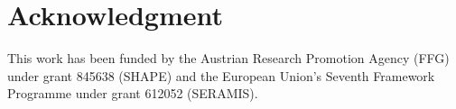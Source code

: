 \documentclass[conference]{IEEEtran}
\begin{document}






\section*{Acknowledgment}
This work has been funded by the Austrian Research Promotion Agency (FFG)
under grant 845638 (SHAPE) and the European Union’s Seventh Framework Programme under grant 612052 (SERAMIS).



\end{document}
